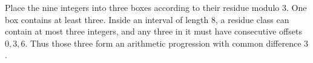 Place the nine integers into three boxes according to their residue modulo $3$. One box contains at least three. Inside an interval of length $8$, a residue class can contain at most three integers, and any three in it must have consecutive offsets $0,3,6$. Thus those three form an arithmetic progression with common difference $3$.
